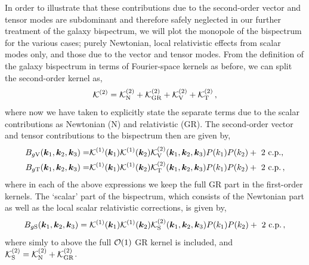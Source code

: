In order to illustrate that these contributions due to the second-order vector and tensor modes are subdominant and therefore safely neglected in our further treatment of the galaxy bispectrum, we will plot the monopole of the bispectrum for the various cases; purely Newtonian, local relativistic effects from scalar modes only, and those due to the vector and tensor modes. 
From the definition of the galaxy bispectrum in terms of Fourier-space kernels as before, we can split the second-order kernel as, 
\begin{equation}
	\mathcal{K}^{(2)} = \mathcal{K}^{(2)}_{\mathrm{N}} + \mathcal{K}^{(2)}_\mathrm{GR} + \mathcal{K}^{(2)}_\mathrm{V} + \mathcal{K}^{(2)}_\mathrm{T}\,,
\end{equation}
where now we have taken to explicitly state the separate terms due to the scalar contributions as Newtonian (N) and relativistic (GR).
The second-order vector and tensor contributions to the bispectrum then are given by, 
\begin{align}
	B_{g\mathrm{V}}(\bm {k}_1,\bm {k}_2,\bm {k}_3) =& \mathcal{K}^{(1)}(\bm {k}_1) \mathcal{K}^{(1)}(\bm {k}_2) \mathcal{K}^{(2)}_\mathrm{V}(\bm {k}_1,\bm {k}_2,\bm {k}_3) P(k_1) P(k_2) + \text{ 2 c.p.}, \\
	B_{g\mathrm{T}}(\bm {k}_1,\bm {k}_2,\bm {k}_3) =& \mathcal{K}^{(1)}(\bm {k}_1) \mathcal{K}^{(1)}(\bm {k}_2) \mathcal{K}^{(2)}_\mathrm{T}(\bm {k}_1,\bm {k}_2,\bm {k}_3) P(k_1) P(k_2) + \text{ 2 c.p.}\,,
\end{align}
where in each of the above expressions we keep the full GR part in the first-order kernels. The `scalar' part of the bispectrum, which consists of the Newtonian part as well as the local scalar relativistic corrections, is given by, 
\begin{equation}
	B_{g\mathrm{S}}(\bm {k}_1,\bm {k}_2,\bm {k}_3) = \mathcal{K}^{(1)}(\bm {k}_1) \mathcal{K}^{(1)}(\bm {k}_2) \mathcal{K}^{(2)}_\mathrm{S}(\bm {k}_1,\bm {k}_2,\bm {k}_3) P(k_1) P(k_2) + \text{ 2 c.p.}\,,
\end{equation}
where simly to above the full $\mathcal{O}(1)$ GR kernel is included, and $\mathcal{K}_\mathrm{S}^{(2)} = \mathcal{K}_{\mathrm{N}}^{(2)} + \mathcal{K}_{\mathrm{GR}}^{(2)}$.


